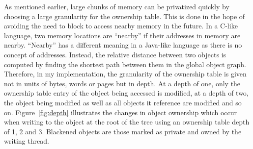 As mentioned earlier, large chunks of memory can be privatized quickly
by choosing a large granularity for the ownership table.  This is done
in the hope of avoiding the need to block to access nearby memory in
the future.  In a C-like language, two memory locations are ``nearby''
if their addresses in memory are nearby.  ``Nearby'' has a different
meaning in a Java-like language as there is no concept of addresses.
Instead, the relative distance between two objects is computed by
finding the shortest path between them in the global object graph.
Therefore, in my implementation, the granularity of the ownership
table is given not in units of bytes, words or pages but in depth.  At
a depth of one, only the ownership table entry of the object being
accessed is modified, at a depth of two, the object being modified as
well as all objects it reference are modified and so on.
Figure~\ref{fig:depth} illustrates the changes in object ownership
which occur when writing to the object at the root of the tree using
an ownership table depth of 1, 2 and 3.  Blackened objects are those
marked as private and owned by the writing thread.

